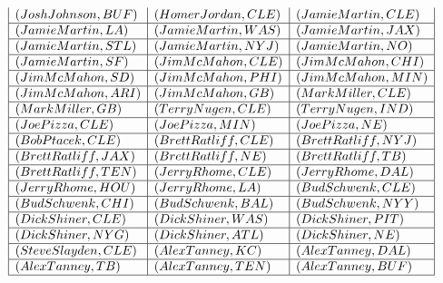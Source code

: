 \documentclass{ximera}
\begin{document}
\begin{center}
\[\begin{array}{|l|l|l|}
(Josh Johnson, BUF) & (Homer Jordan, CLE) & (Jamie Martin, CLE) \\\hline 


(Jamie Martin, LA) & (Jamie Martin, WAS) & (Jamie Martin, JAX) \\\hline


(Jamie Martin, STL) & (Jamie Martin, NYJ) & (Jamie Martin, NO) \\\hline 


(Jamie Martin, SF) & (Jim McMahon, CLE) & (Jim McMahon, CHI) \\\hline 


(Jim McMahon, SD) & (Jim McMahon, PHI) & (Jim McMahon, MIN) \\\hline 


(Jim McMahon, ARI) & (Jim McMahon, GB) & (Mark Miller, CLE) \\\hline 


(Mark Miller, GB) &(Terry Nugen, CLE) & (Terry Nugen, IND) \\\hline 


(Joe Pizza, CLE) & (Joe Pizza, MIN) & (Joe Pizza, NE) \\\hline 


(Bob Ptacek, CLE) & (Brett Ratliff, CLE) & (Brett Ratliff, NYJ) \\\hline 


(Brett Ratliff, JAX) & (Brett Ratliff, NE) & (Brett Ratliff, TB) \\\hline 


(Brett Ratliff, TEN) & (Jerry Rhome, CLE) & (Jerry Rhome, DAL) \\\hline 


(Jerry Rhome, HOU) & (Jerry Rhome, LA) & (Bud Schwenk, CLE) \\\hline 


(Bud Schwenk, CHI) & (Bud Schwenk, BAL) & (Bud Schwenk, NYY) \\\hline 


(Dick Shiner, CLE) & (Dick Shiner, WAS) & (Dick Shiner, PIT) \\\hline 


(Dick Shiner, NYG) & (Dick Shiner, ATL) & (Dick Shiner, NE) \\\hline 


(Steve Slayden, CLE) & (Alex Tanney, KC) & (Alex Tanney, DAL) \\\hline 


(Alex Tanney, TB) & (Alex Tanney, TEN) & (Alex Tanney, BUF) \\\hline 



\end{array}\]
\end{center}
\end{document}
